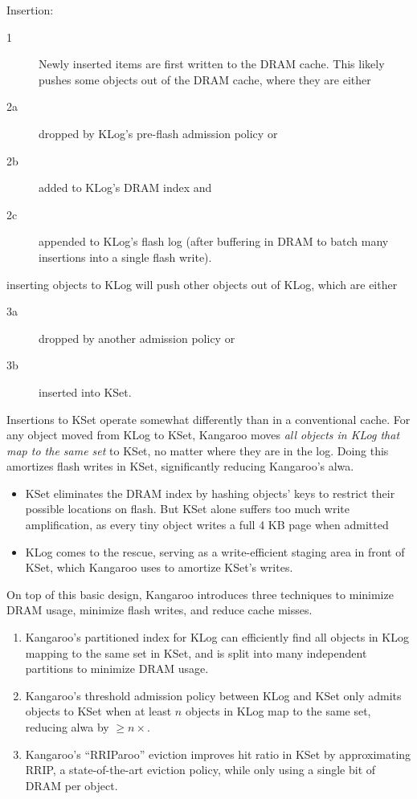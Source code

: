 \documentclass[11pt]{article}
\begin{document}
Insertion:
\begin{description}
\item[{1}] Newly inserted items are first written to the DRAM cache. This likely pushes some objects out
of the DRAM cache, where they are either
\item[{2a}] dropped by KLog’s pre-flash admission policy or
\item[{2b}] added to KLog’s DRAM index and
\item[{2c}] appended to KLog’s flash log (after buffering in DRAM to batch many insertions into a single flash write).
\end{description}
inserting objects to KLog will push other objects out of KLog, which are either
\begin{description}
\item[{3a}] dropped by another admission policy or
\item[{3b}] inserted into KSet.
\end{description}

Insertions to KSet operate somewhat differently than in a conventional cache. For any object moved
from KLog to KSet, Kangaroo moves \emph{all objects in KLog that map to the same set} to KSet, no matter
where they are in the log. Doing this amortizes flash writes in KSet, significantly reducing
Kangaroo’s alwa.

\begin{itemize}
\item KSet eliminates the DRAM index by hashing objects’ keys to restrict their possible locations on
flash. But KSet alone suffers too much write amplification, as every tiny object writes a full 4 KB
page when admitted
\item KLog comes to the rescue, serving as a write-efficient staging area in front of KSet, which Kangaroo
uses to amortize KSet’s writes.
\end{itemize}

On top of this basic design, Kangaroo introduces three techniques to minimize DRAM usage, minimize
flash writes, and reduce cache misses.
\begin{enumerate}
\item Kangaroo’s partitioned index for KLog can efficiently find all objects in KLog mapping to the same
set in KSet, and is split into many independent partitions to minimize DRAM usage.
\item Kangaroo’s threshold admission policy between KLog and KSet only admits objects to KSet when at
least \(n\) objects in KLog map to the same set, reducing alwa by \(\ge n\times\).
\item Kangaroo’s “RRIParoo” eviction improves hit ratio in KSet by approximating RRIP, a state-of-the-art
eviction policy, while only using a single bit of DRAM per object.
\end{enumerate}
\end{document}
